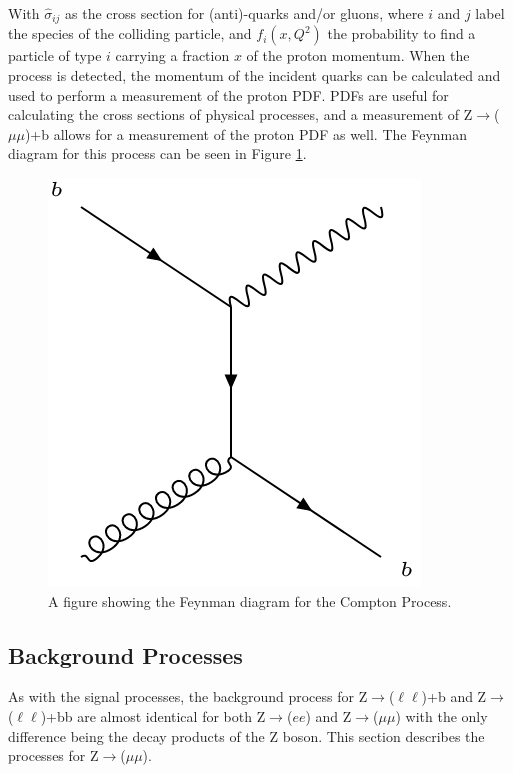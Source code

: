 \documentclass[12pt,a4paper,epsf,portrait,times,epsfig]{report}
\begin{document}
		With $\hat{\sigma}_{ij}$ as the cross section for (anti)-quarks and/or gluons, where $i$ and $j$ label the species of the colliding particle, and $f_{i}(x,Q^{2})$ the probability to find a particle of type $i$ carrying a fraction $x$ of the proton momentum\cite{Article:PartonDistributions}. When the process is detected, the momentum of the incident quarks can be calculated and used to perform a measurement of the proton PDF. PDFs are useful for calculating the cross sections of physical processes, and a measurement of Z$\rightarrow$($\mu\mu$)+b allows for a measurement of the proton PDF as well. The Feynman diagram for this process can be seen in Figure \ref{Fig:ZbbCompton}.
		
		\begin{figure}[h!]
			\centering
			\includegraphics[scale=0.5]{Zbb_3.png}
			\caption{A figure showing the Feynman diagram for the Compton Process.}
			\label{Fig:ZbbCompton} 
		\end{figure}
			
		\subsection{Background Processes}
	
		As with the signal processes, the background process for Z$\rightarrow$($\ell\ell$)+b and Z$\rightarrow$($\ell\ell$)+bb are almost identical for both Z$\rightarrow$($ee$) and Z$\rightarrow$($\mu\mu$) with the only difference being the decay products of the Z boson. This section describes the processes for Z$\rightarrow$($\mu\mu$). \par
		
\end{document}

